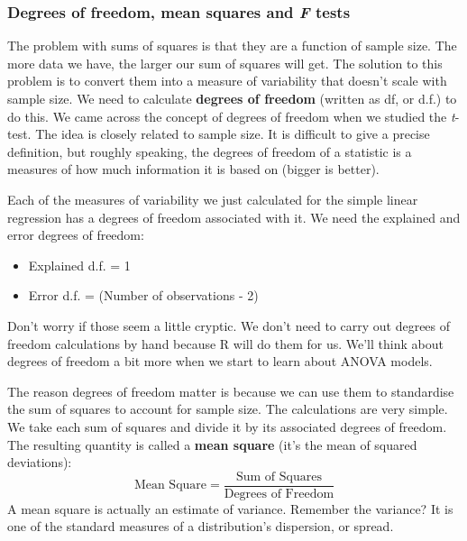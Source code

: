 \documentclass[
]{book}
\begin{document}
\hypertarget{degrees-of-freedom-mean-squares-and-f-tests}{%
\subsubsection*{\texorpdfstring{Degrees of freedom, mean squares and \emph{F} tests}{Degrees of freedom, mean squares and F tests}}\label{degrees-of-freedom-mean-squares-and-f-tests}}

The problem with sums of squares is that they are a function of sample size. The more data we have, the larger our sum of squares will get. The solution to this problem is to convert them into a measure of variability that doesn't scale with sample size. We need to calculate \textbf{degrees of freedom} (written as df, or d.f.) to do this. We came across the concept of degrees of freedom when we studied the \emph{t}-test. The idea is closely related to sample size. It is difficult to give a precise definition, but roughly speaking, the degrees of freedom of a statistic is a measures of how much information it is based on (bigger is better).

Each of the measures of variability we just calculated for the simple linear regression has a degrees of freedom associated with it. We need the explained and error degrees of freedom:

\begin{itemize}
\item
  Explained d.f. = 1
\item
  Error d.f. = (Number of observations - 2)
\end{itemize}

Don't worry if those seem a little cryptic. We don't need to carry out degrees of freedom calculations by hand because R will do them for us. We'll think about degrees of freedom a bit more when we start to learn about ANOVA models.

The reason degrees of freedom matter is because we can use them to standardise the sum of squares to account for sample size. The calculations are very simple. We take each sum of squares and divide it by its associated degrees of freedom. The resulting quantity is called a \textbf{mean square} (it's the mean of squared deviations): \[
\text{Mean Square} = \frac{\text{Sum of Squares}}{\text{Degrees of Freedom}}
\] A mean square is actually an estimate of variance. Remember the variance? It is one of the standard measures of a distribution's dispersion, or spread.
\end{document}
